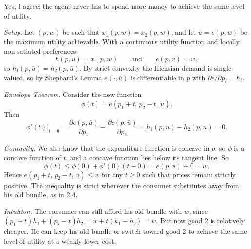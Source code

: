 \documentclass[12pt,letterpaper]{article}
\begin{document}
Yes, I agree: the agent never has to spend more money to achieve the same level of utility.

\textit{Setup.} Let $(p,w)$ be such that $x_1(p,w)=x_2(p,w)$, and let $\bar u = v(p,w)$ be the maximum utility achievable. With a continuous utility function and locally non-satiated preferences,
\[
h(p,\bar u) = x(p,w) \qquad\text{and}\qquad e(p,\bar u) = w,
\]
so $h_1(p,\bar u) = h_2(p,\bar u)$. By strict convexity the Hicksian demand is single-valued, so by Shephard's Lemma $e(\cdot,\bar u)$ is differentiable in $p$ with $\partial e/\partial p_\ell = h_\ell$.

\textit{Envelope Theorem.} Consider the new function
\[
\phi(t) = e(p_1+t,\,p_2-t,\,\bar u).
\]
Then
\[
\phi'(t)\big|_{t=0} = \frac{\partial e(p,\bar u)}{\partial p_1} - \frac{\partial e(p,\bar u)}{\partial p_2} = h_1(p,\bar u) - h_2(p,\bar u) = 0 .
\]

\textit{Concavity.} We also know that the expenditure function is concave in $p$, so $\phi$ is a concave function of $t$, and a concave function lies below its tangent line. So
\[
\phi(t) \le \phi(0) + \phi'(0)(t-0) = e(p,\bar u) + 0 = w .
\]
Hence $e(p_1+t,\,p_2-t,\,\bar u)\le w$ for any $t\ge 0$ such that prices remain strictly positive. The inequality is strict whenever the consumer substitutes away from his old bundle, as in 2.4.

\textit{Intuition.} The consumer can still afford his old bundle with $w$, since $(p_1+t)h_1+(p_2-t)h_2 = w + t(h_1-h_2) = w$. But now good 2 is relatively cheaper. He can keep his old bundle or switch toward good 2 to achieve the same level of utility at a weakly lower cost.
\end{document}
